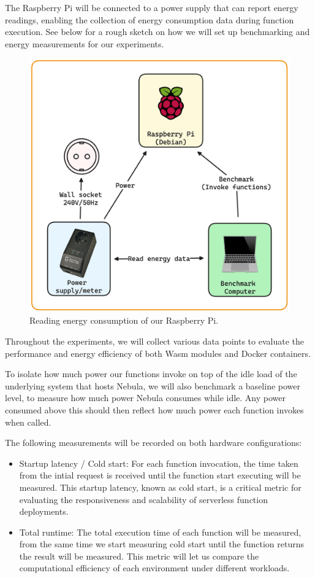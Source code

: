 \documentclass[
  table]{report}
\begin{document}
The Raspberry Pi will be connected to a power supply that can report
energy readings, enabling the collection of energy consumption data
during function execution. See  below for a
rough sketch on how we will set up benchmarking and energy measurements
for our experiments.

\begin{figure}[H]
\centering
  \includegraphics[width=0.7\columnwidth]{assets/4-benchmark-setup.png}
  \caption{Reading energy consumption of our Raspberry Pi.}
  \label{fig:benchmark-setup}
\end{figure}

Throughout the experiments, we will collect various data points to
evaluate the performance and energy efficiency of both \ac{Wasm} modules
and Docker containers.

To isolate how much power our functions invoke on top of the idle load
of the underlying system that hosts Nebula, we will also benchmark a
baseline power level, to measure how much power Nebula consumes while
idle. Any power consumed above this should then reflect how much power
each function invokes when called.

The following measurements will be recorded on both hardware
configurations:

\begin{itemize}
\item
  Startup latency / Cold start: For each function invocation, the time
  taken from the intial request is received until the function start
  executing will be measured. This startup latency, known as cold start,
  is a critical metric for evaluating the responsiveness and scalability
  of serverless function deployments.
\item
  Total runtime: The total execution time of each function will be
  measured, from the same time we start measuring cold start until the
  function returns the result will be measured. This metric will let us
  compare the computational efficiency of each environment under
  different workloads.
\end{itemize}
\end{document}
